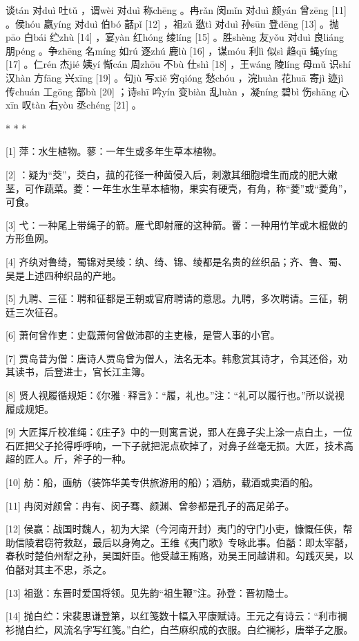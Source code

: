 \documentclass[12pt,UTF8]{ctexbook}
\begin{document}
谈tán 对duì 吐tǔ ，谓wèi 对duì 称chēng 。冉rǎn 闵mǐn 对duì 颜yán 曾zēng [11] 。侯hóu 嬴yíng 对duì 伯bó 嚭pǐ [12] ，祖zǔ 逖tì 对duì 孙sūn 登dēng [13] 。抛pāo 白bái 纻zhù [14] ，宴yàn 红hóng 绫líng [15] 。胜shèng 友yǒu 对duì 良liáng 朋péng 。争zhēng 名míng 如rú 逐zhú 鹿lù [16] ，谋móu 利lì 似sì 趋qū 蝇yíng [17] 。仁rén 杰jié 姨yí 惭cán 周zhōu 不bù 仕shì [18] ，王wáng 陵líng 母mǔ 识shí 汉hàn 方fāng 兴xīng [19] 。句jù 写xiě 穷qióng 愁chóu ，浣huàn 花huā 寄jì 迹jì 传chuán 工gōng 部bù [20] ；诗shī 吟yín 变biàn 乱luàn ，凝níng 碧bì 伤shāng 心xīn 叹tàn 右yòu 丞chéng [21] 。



* * *



[1] 萍：水生植物。蓼：一年生或多年生草本植物。

[2] ：疑为“茭”，茭白，菰的花径一种菌侵入后，刺激其细胞增生而成的肥大嫩茎，可作蔬菜。菱：一年生水生草本植物，果实有硬壳，有角，称“菱”或“菱角”，可食。

[3] 弋：一种尾上带绳子的箭。雁弋即射雁的这种箭。罾：一种用竹竿或木棍做的方形鱼网。

[4] 齐纨对鲁绮，蜀锦对吴绫：纨、绮、锦、绫都是名贵的丝织品；齐、鲁、蜀、吴是上述四种织品的产地。

[5] 九聘、三征：聘和征都是王朝或官府聘请的意思。九聘，多次聘请。三征，朝廷三次征召。

[6] 萧何曾作吏：史载萧何曾做沛郡的主吏椽，是管人事的小官。

[7] 贾岛昔为僧：唐诗人贾岛曾为僧人，法名无本。韩愈赏其诗才，令其还俗，劝其读书，后登进士，官长江主簿。

[8] 贤人视履循规矩：《尔雅·释言》：“履，礼也。”注：“礼可以履行也。”所以说视履成规矩。

[9] 大匠挥斤校准绳：《庄子》中的一则寓言说，郢人在鼻子尖上涂一点白土，一位石匠把父子抡得呼呼响，一下子就把泥点砍掉了，对鼻子丝毫无损。大匠，技术高超的匠人。斤，斧子的一种。

[10] 舫：船，画舫（装饰华美专供旅游用的船）；酒舫，载酒或卖酒的船。

[11] 冉闵对颜曾：冉有、闵子骞、颜渊、曾参都是孔子的高足弟子。

[12] 侯嬴：战国时魏人，初为大梁（今河南开封）夷门的守门小吏，慷慨任侠，帮助信陵君窃符救赵，最后以身殉之。王维《夷门歌》专咏此事。伯嚭：即太宰嚭，春秋时楚伯州犁之孙，吴国奸臣。他受越王贿赂，劝吴王同越讲和。勾践灭吴，以伯嚭对其主不忠，杀之。

[13] 祖逖：东晋时爱国将领。见先韵“祖生鞭”注。孙登：晋初隐士。

[14] 抛白纻：宋裴思谦登第，以红笺数十幅入平康赋诗。王元之有诗云：“利市襕衫抛白纻，风流名字写红笺。”白纻，白苎麻织成的衣服。白纻襕衫，唐举子之服。
\end{document}
